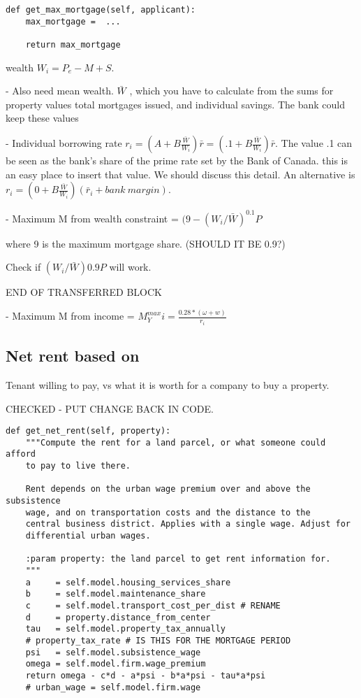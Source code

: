 {\begin{lstlisting}
def get_max_mortgage(self, applicant):
    max_mortgage =  ...
    
    return max_mortgage
\end{lstlisting}

wealth $W_i = P_e-M+S$.  

- Also need mean wealth. $\bar W$ , which you have to calculate from the sums for property values total mortgages issued, and individual savings. The bank could keep these values

- Individual borrowing rate 
$r_i = (A + B \frac{\bar{W}}{W_i})\bar r=(.1 + B \frac{\bar{W}}{W_i})\bar r$.
The value .1 can be seen as the bank's share of the prime rate set by the Bank of Canada. this is an easy place to insert that value. We should discuss this detail. An alternative is
$r_i = (0 + B \frac{\bar{W}}{W_i})(\bar r_i+ bank\ margin)$.

- Maximum M  from wealth constraint = $(9-(W_i/\bar W)^{0.1}P$

where 9 is the maximum mortgage share. (SHOULD IT BE 0.9?)

  Check if $(W_i/\bar W)0.9P$ will work. 


END OF TRANSFERRED BLOCK
}

- Maximum M  from income = $M^{max}_Yi = \frac{0.28*(\omega+w)}{r_i}$ 
 
\subsection{Net rent based on}
Tenant willing to pay, vs what it is worth for a company to buy a property.


CHECKED - PUT CHANGE BACK IN CODE.

\begin{lstlisting}
def get_net_rent(self, property):
    """Compute the rent for a land parcel, or what someone could afford
    to pay to live there. 

    Rent depends on the urban wage premium over and above the subsistence
    wage, and on transportation costs and the distance to the
    central business district. Applies with a single wage. Adjust for
    differential urban wages.

    :param property: the land parcel to get rent information for.
    """
    a     = self.model.housing_services_share
    b     = self.model.maintenance_share
    c     = self.model.transport_cost_per_dist # RENAME
    d     = property.distance_from_center 
    tau   = self.model.property_tax_annually 
    # property_tax_rate # IS THIS FOR THE MORTGAGE PERIOD
    psi   = self.model.subsistence_wage
    omega = self.model.firm.wage_premium 
    return omega - c*d - a*psi - b*a*psi - tau*a*psi
    # urban_wage = self.model.firm.wage
\end{lstlisting}


